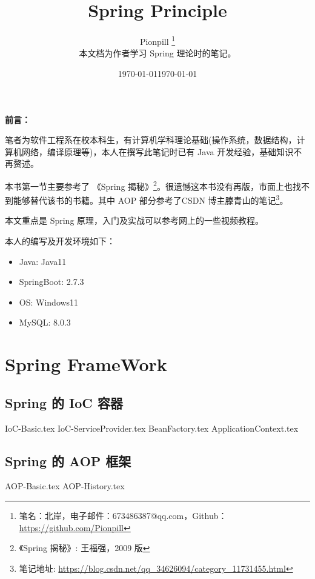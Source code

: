 \documentclass{PionpillNote-book}
\title{Spring Principle}
\author{
    Pionpill \footnote{笔名：北岸，电子邮件：673486387@qq.com，Github：\url{https://github.com/Pionpill}} \\
    本文档为作者学习 Spring 理论时的笔记。\\
}
\date{\today}
\begin{document}
\pagestyle{plain}
\maketitle

\noindent\textbf{前言：}

笔者为软件工程系在校本科生，有计算机学科理论基础(操作系统，数据结构，计算机网络，编译原理等)，本人在撰写此笔记时已有 Java 开发经验，基础知识不再赘述。

本书第一节主要参考了 《Spring 揭秘》\footnote{《Spring 揭秘》: 王福强，2009 版}。很遗憾这本书没有再版，市面上也找不到能够替代该书的书籍。其中 AOP 部分参考了CSDN 博主滕青山的笔记\footnote{笔记地址: \url{https://blog.csdn.net/qq_34626094/category_11731455.html}}。

本文重点是 Spring 原理，入门及实战可以参考网上的一些视频教程。

本人的编写及开发环境如下：
\begin{itemize}
    \item Java: Java11
    \item SpringBoot: 2.7.3
    \item OS: Windows11 
    \item MySQL: 8.0.3
\end{itemize}

\date{\today}
\newpage

\tableofcontents

\newpage

\setcounter{page}{1} 
\pagestyle{fancy}

\part{Spring FrameWork}
\chapter{Spring 的 IoC 容器}
{IoC-Basic.tex}
{IoC-ServiceProvider.tex}
{BeanFactory.tex}
{ApplicationContext.tex}
\chapter{Spring 的 AOP 框架}
{AOP-Basic.tex}
{AOP-History.tex}
\end{document}
